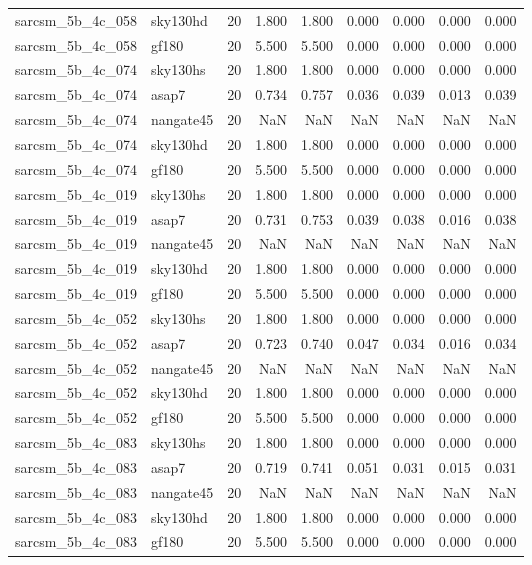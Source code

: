 \begin{tabular}{llrrrrrrr}
sarcsm\_5b\_4c\_058 & sky130hd & 20 & 1.800 & 1.800 & 0.000 & 0.000 & 0.000 & 0.000 \\
sarcsm\_5b\_4c\_058 & gf180 & 20 & 5.500 & 5.500 & 0.000 & 0.000 & 0.000 & 0.000 \\
sarcsm\_5b\_4c\_074 & sky130hs & 20 & 1.800 & 1.800 & 0.000 & 0.000 & 0.000 & 0.000 \\
sarcsm\_5b\_4c\_074 & asap7 & 20 & 0.734 & 0.757 & 0.036 & 0.039 & 0.013 & 0.039 \\
sarcsm\_5b\_4c\_074 & nangate45 & 20 & NaN & NaN & NaN & NaN & NaN & NaN \\
sarcsm\_5b\_4c\_074 & sky130hd & 20 & 1.800 & 1.800 & 0.000 & 0.000 & 0.000 & 0.000 \\
sarcsm\_5b\_4c\_074 & gf180 & 20 & 5.500 & 5.500 & 0.000 & 0.000 & 0.000 & 0.000 \\
sarcsm\_5b\_4c\_019 & sky130hs & 20 & 1.800 & 1.800 & 0.000 & 0.000 & 0.000 & 0.000 \\
sarcsm\_5b\_4c\_019 & asap7 & 20 & 0.731 & 0.753 & 0.039 & 0.038 & 0.016 & 0.038 \\
sarcsm\_5b\_4c\_019 & nangate45 & 20 & NaN & NaN & NaN & NaN & NaN & NaN \\
sarcsm\_5b\_4c\_019 & sky130hd & 20 & 1.800 & 1.800 & 0.000 & 0.000 & 0.000 & 0.000 \\
sarcsm\_5b\_4c\_019 & gf180 & 20 & 5.500 & 5.500 & 0.000 & 0.000 & 0.000 & 0.000 \\
sarcsm\_5b\_4c\_052 & sky130hs & 20 & 1.800 & 1.800 & 0.000 & 0.000 & 0.000 & 0.000 \\
sarcsm\_5b\_4c\_052 & asap7 & 20 & 0.723 & 0.740 & 0.047 & 0.034 & 0.016 & 0.034 \\
sarcsm\_5b\_4c\_052 & nangate45 & 20 & NaN & NaN & NaN & NaN & NaN & NaN \\
sarcsm\_5b\_4c\_052 & sky130hd & 20 & 1.800 & 1.800 & 0.000 & 0.000 & 0.000 & 0.000 \\
sarcsm\_5b\_4c\_052 & gf180 & 20 & 5.500 & 5.500 & 0.000 & 0.000 & 0.000 & 0.000 \\
sarcsm\_5b\_4c\_083 & sky130hs & 20 & 1.800 & 1.800 & 0.000 & 0.000 & 0.000 & 0.000 \\
sarcsm\_5b\_4c\_083 & asap7 & 20 & 0.719 & 0.741 & 0.051 & 0.031 & 0.015 & 0.031 \\
sarcsm\_5b\_4c\_083 & nangate45 & 20 & NaN & NaN & NaN & NaN & NaN & NaN \\
sarcsm\_5b\_4c\_083 & sky130hd & 20 & 1.800 & 1.800 & 0.000 & 0.000 & 0.000 & 0.000 \\
sarcsm\_5b\_4c\_083 & gf180 & 20 & 5.500 & 5.500 & 0.000 & 0.000 & 0.000 & 0.000 \\

\end{tabular}
